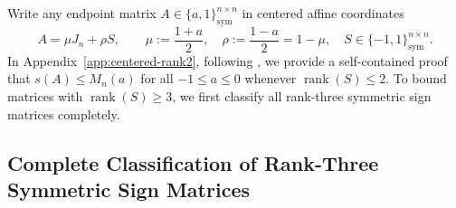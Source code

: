 \documentclass[11pt,reqno]{article}
\theoremstyle{definition}
\newcommand{\rank}{\operatorname{rank}}
\begin{document}
Write any endpoint matrix $A \in \{a, 1\}^{n \times n}_{\text{sym}}$ in centered affine coordinates
\begin{equation}\label{eq:affine-centered}
A = \mu J_n + \rho S, \qquad \mu := \frac{1+a}{2},\quad \rho := \frac{1-a}{2} = 1 - \mu, \quad S \in \{-1, 1\}^{n \times n}_{\text{sym}}.
\end{equation}
In Appendix~\ref{app:centered-rank2}, following \cite{holden2026b}, we provide a self-contained proof that $s(A) \le M_n(a)$ for all $-1 \le a \le 0$ whenever $\rank(S) \le 2$. To bound matrices with $\rank(S) \ge 3$, we first classify all rank-three symmetric sign matrices completely.

\subsection{Complete Classification of Rank-Three Symmetric Sign Matrices}
\end{document}
